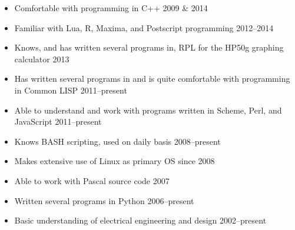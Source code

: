 \documentclass{res}
\begin{document}
\begin{resume}
\begin{itemize}
 \item Comfortable with programming in C++ \hfill 2009 \& 2014
 \item Familiar with Lua, R, Maxima, and Postscript programming \hfill
       2012--2014
 \item Knows, and has written several programs in, RPL for the HP50g
       graphing calculator \hfill 2013
 \item Has written several programs in and is quite comfortable with
       programming in Common LISP \hfill 2011--present
 \item Able to understand and work with programs written in Scheme,
       Perl, and JavaScript \hfill 2011--present
 \item Knows BASH scripting, used on daily basis \hfill 2008--present
 \item Makes extensive use of Linux as primary OS since 2008
 \item Able to work with Pascal source code \hfill 2007
 \item Written several programs in Python \hfill 2006--present
 \item Basic understanding of electrical engineering and design \hfill
       2002--present
\end{itemize}

\end{resume}
\end{document}
